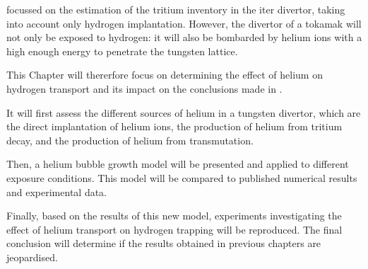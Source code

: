  focussed on the estimation of the tritium inventory in the \gls{iter} \gls{divertor}, taking into account only hydrogen implantation.
However, the \gls{divertor} of a \gls{tokamak} will not only be exposed to hydrogen: it will also be bombarded by helium ions with a high enough energy to penetrate the tungsten lattice.

This Chapter will thererfore focus on determining the effect of helium on hydrogen transport and its impact on the conclusions made in .

It will first assess the different sources of helium in a tungsten \gls{divertor}, which are the direct implantation of helium ions, the production of helium from tritium decay, and the production of helium from \gls{transmutation}.

Then, a helium bubble growth model will be presented and applied to different exposure conditions.
This model will be compared to published numerical results and experimental data.

Finally, based on the results of this new model, experiments investigating the effect of helium transport on hydrogen trapping will be reproduced.
The final conclusion will determine if the results obtained in previous chapters are jeopardised.
